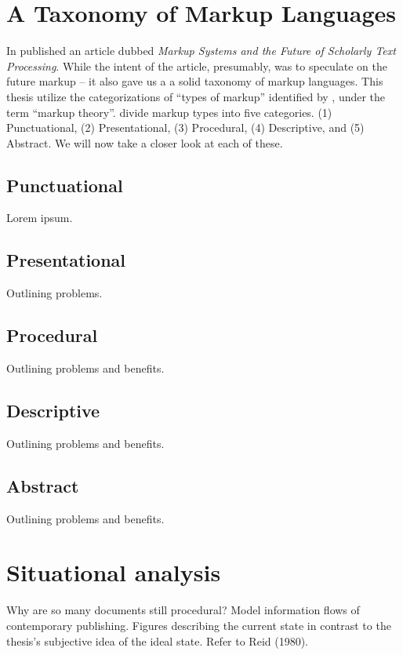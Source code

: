 \documentclass{scrreprt}
\begin{document}
\section{A Taxonomy of Markup Languages}
In \citeyearpar{coombs} \citeauthor*{coombs} published an article dubbed \emph{Markup Systems and the Future of Scholarly Text Processing}. While the intent of the article, presumably, was to speculate on the future markup -- it also gave us a a solid taxonomy of markup languages. This thesis utilize the categorizations of ``types of markup'' identified by \citet{coombs}, under the term ``markup theory''. \citet{coombs} divide markup types into five categories. (1) Punctuational, (2) Presentational, (3) Procedural, (4) Descriptive, and (5) Abstract. We will now take a closer look at each of these.


\subsection{Punctuational}
Lorem ipsum.


\subsection{Presentational}
Outlining problems.


\subsection{Procedural}
Outlining problems and benefits.


\subsection{Descriptive}
Outlining problems and benefits.


\subsection{Abstract}
Outlining problems and benefits.




\section{Situational analysis}
Why are so many documents still procedural?
Model information flows of contemporary publishing. Figures describing the current state in contrast to the thesis's subjective idea of the ideal state. Refer to Reid (1980).
\end{document}
